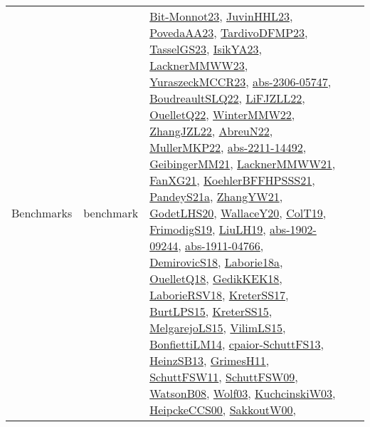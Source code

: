 {\begin{longtable}{lp{3cm}>{\raggedright}p{6cm}>{\raggedright}p{6cm}p{8cm}}
Benchmarks & benchmark & \href{papers/Bit-Monnot23.pdf}{Bit-Monnot23}\cite{Bit-Monnot23}, \href{papers/JuvinHHL23.pdf}{JuvinHHL23}\cite{JuvinHHL23}, \href{papers/PovedaAA23.pdf}{PovedaAA23}\cite{PovedaAA23}, \href{papers/TardivoDFMP23.pdf}{TardivoDFMP23}\cite{TardivoDFMP23}, \href{papers/TasselGS23.pdf}{TasselGS23}\cite{TasselGS23}, \href{articles/IsikYA23.pdf}{IsikYA23}\cite{IsikYA23}, \href{articles/LacknerMMWW23.pdf}{LacknerMMWW23}\cite{LacknerMMWW23}, \href{articles/YuraszeckMCCR23.pdf}{YuraszeckMCCR23}\cite{YuraszeckMCCR23}, \href{articles/abs-2306-05747.pdf}{abs-2306-05747}\cite{abs-2306-05747}, \href{papers/BoudreaultSLQ22.pdf}{BoudreaultSLQ22}\cite{BoudreaultSLQ22}, \href{papers/LiFJZLL22.pdf}{LiFJZLL22}\cite{LiFJZLL22}, \href{papers/OuelletQ22.pdf}{OuelletQ22}\cite{OuelletQ22}, \href{papers/WinterMMW22.pdf}{WinterMMW22}\cite{WinterMMW22}, \href{papers/ZhangJZL22.pdf}{ZhangJZL22}\cite{ZhangJZL22}, \href{articles/AbreuN22.pdf}{AbreuN22}\cite{AbreuN22}, \href{articles/MullerMKP22.pdf}{MullerMKP22}\cite{MullerMKP22}, \href{articles/abs-2211-14492.pdf}{abs-2211-14492}\cite{abs-2211-14492}, \href{papers/GeibingerMM21.pdf}{GeibingerMM21}\cite{GeibingerMM21}, \href{papers/LacknerMMWW21.pdf}{LacknerMMWW21}\cite{LacknerMMWW21}, \href{articles/FanXG21.pdf}{FanXG21}\cite{FanXG21}, \href{articles/KoehlerBFFHPSSS21.pdf}{KoehlerBFFHPSSS21}\cite{KoehlerBFFHPSSS21}, \href{articles/PandeyS21a.pdf}{PandeyS21a}\cite{PandeyS21a}, \href{articles/ZhangYW21.pdf}{ZhangYW21}\cite{ZhangYW21}, \href{papers/GodetLHS20.pdf}{GodetLHS20}\cite{GodetLHS20}, \href{articles/WallaceY20.pdf}{WallaceY20}\cite{WallaceY20}, \href{papers/ColT19.pdf}{ColT19}\cite{ColT19}, \href{papers/FrimodigS19.pdf}{FrimodigS19}\cite{FrimodigS19}, \href{papers/LiuLH19.pdf}{LiuLH19}\cite{LiuLH19}, \href{articles/abs-1902-09244.pdf}{abs-1902-09244}\cite{abs-1902-09244}, \href{articles/abs-1911-04766.pdf}{abs-1911-04766}\cite{abs-1911-04766}, \href{papers/DemirovicS18.pdf}{DemirovicS18}\cite{DemirovicS18}, \href{papers/Laborie18a.pdf}{Laborie18a}\cite{Laborie18a}, \href{papers/OuelletQ18.pdf}{OuelletQ18}\cite{OuelletQ18}, \href{articles/GedikKEK18.pdf}{GedikKEK18}\cite{GedikKEK18}, \href{articles/LaborieRSV18.pdf}{LaborieRSV18}\cite{LaborieRSV18}, \href{articles/KreterSS17.pdf}{KreterSS17}\cite{KreterSS17}, \href{papers/BurtLPS15.pdf}{BurtLPS15}\cite{BurtLPS15}, \href{papers/KreterSS15.pdf}{KreterSS15}\cite{KreterSS15}, \href{papers/MelgarejoLS15.pdf}{MelgarejoLS15}\cite{MelgarejoLS15}, \href{papers/VilimLS15.pdf}{VilimLS15}\cite{VilimLS15}, \href{papers/BonfiettiLM14.pdf}{BonfiettiLM14}\cite{BonfiettiLM14}, \href{papers/cpaior-SchuttFS13.pdf}{cpaior-SchuttFS13}\cite{cpaior-SchuttFS13}, \href{articles/HeinzSB13.pdf}{HeinzSB13}\cite{HeinzSB13}, \href{papers/GrimesH11.pdf}{GrimesH11}\cite{GrimesH11}, \href{articles/SchuttFSW11.pdf}{SchuttFSW11}\cite{SchuttFSW11}, \href{papers/SchuttFSW09.pdf}{SchuttFSW09}\cite{SchuttFSW09}, \href{papers/WatsonB08.pdf}{WatsonB08}\cite{WatsonB08}, \href{papers/Wolf03.pdf}{Wolf03}\cite{Wolf03}, \href{articles/KuchcinskiW03.pdf}{KuchcinskiW03}\cite{KuchcinskiW03}, \href{articles/HeipckeCCS00.pdf}{HeipckeCCS00}\cite{HeipckeCCS00}, \href{articles/SakkoutW00.pdf}{SakkoutW00}\cite{SakkoutW00}, 
\end{longtable}}
